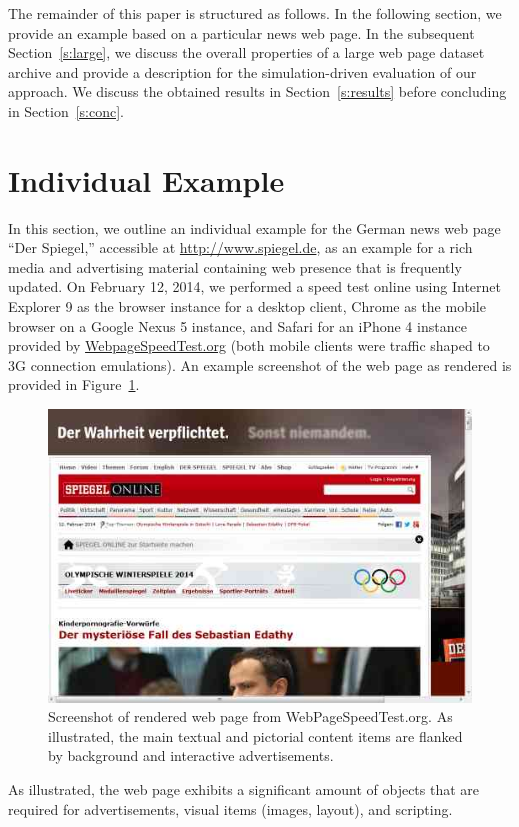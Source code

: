 \documentclass[letterpaper,journal,onecolumn,draftcls]{IEEEtran}
\begin{document}
The remainder of this paper is structured as follows.
In the following section, %
we provide an example based on a particular news web page.
In the subsequent Section~\ref{s:large}, we discuss the overall properties of a large web page dataset archive and provide a description for the simulation-driven evaluation of our approach. We discuss the obtained results in Section~\ref{s:results} before concluding in Section~\ref{s:conc}.







\section{Individual Example}
\label{s:example}
In this section, we outline an individual example for the German news web page ``Der Spiegel,'' accessible at \url{http://www.spiegel.de}, as an example for a rich media and advertising material containing web presence that is frequently updated.
On February 12, 2014, we performed a speed test online using Internet Explorer 9 as the browser instance for a desktop client, Chrome as the mobile browser on a Google Nexus 5 instance, and Safari for an iPhone 4 instance provided by \url{WebpageSpeedTest.org} (both mobile clients were traffic shaped to 3G connection emulations).
An example screenshot of the web page as rendered is provided in Figure~\ref{fig:screens}.
\begin{figure}
	\centering
	\includegraphics[width=.5\linewidth]{1screen}
	\caption{Screenshot of rendered web page from WebPageSpeedTest.org. As illustrated, the main textual and pictorial content items are flanked by background and interactive advertisements.}
	\label{fig:screens}
\end{figure}
As illustrated, the web page exhibits a significant amount of objects that are required for advertisements, visual items (images, layout), and scripting.
\end{document}
